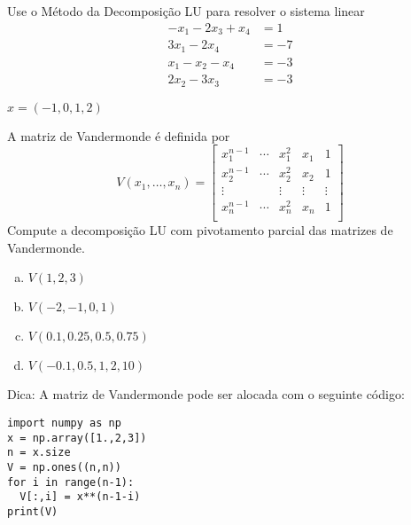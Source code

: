 \begin{exer}
  Use o Método da Decomposição LU para resolver o sistema linear
  \begin{align}
    -x_1 - 2x_3 + x_4 &= 1\\
    3x_1 - 2x_4 &= -7\\
    x_1 - x_2 - x_4 &= -3\\
    2x_2 - 3x_3 &= -3
  \end{align}
\end{exer}
\begin{resp}
  $x = (-1, 0, 1, 2)$
\end{resp}

\begin{exer}
  A matriz de Vandermonde{\vandermonde} é definida por
  \begin{equation}
    V(x_1,\ldots,x_n) =
    \begin{bmatrix}
      x_1^{n-1} & \cdots  & x_1^2 & x_1 & 1\\
      x_2^{n-1} & \cdots  & x_2^2 & x_2 & 1\\
      \vdots   &         & \vdots & \vdots & \vdots\\
      x_n^{n-1} & \cdots  & x_n^2 & x_n & 1\\
    \end{bmatrix}
  \end{equation}
  Compute a decomposição LU com pivotamento parcial das matrizes de Vandermonde{\vandermonde}.
  \begin{enumerate}[a)]
  \item $V(1, 2, 3)$\\
  \item $V(-2, -1, 0, 1)$\\
  \item $V(0.1, 0.25, 0.5, 0.75)$\\
  \item $V(-0.1, 0.5, 1, 2, 10)$
  \end{enumerate}
\end{exer}
\begin{resp}
  Dica: A matriz de Vandermonde pode ser alocada com o seguinte código:

\begin{lstlisting}
import numpy as np
x = np.array([1.,2,3])
n = x.size
V = np.ones((n,n))
for i in range(n-1):
  V[:,i] = x**(n-1-i)
print(V)
\end{lstlisting}

\end{resp}

